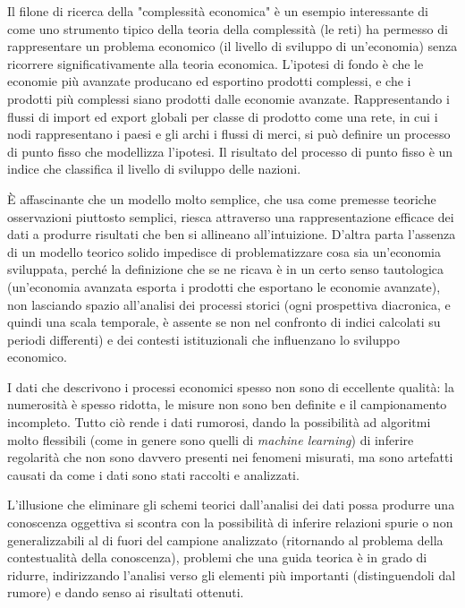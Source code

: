 \documentclass[a4paper, headings=standardclasses]{scrartcl}
\begin{document}
Il filone di ricerca della "complessità economica" \parencite{hidalgo2021} è un esempio interessante di come uno strumento tipico della teoria della complessità (le reti) ha permesso di rappresentare un problema economico (il livello di sviluppo di un'economia) senza ricorrere significativamente alla teoria economica.
L'ipotesi di fondo è che le economie più avanzate producano ed esportino prodotti complessi, e che i prodotti più complessi siano prodotti dalle economie avanzate.
Rappresentando i flussi di import ed export globali per classe di prodotto come una rete, in cui i nodi rappresentano i paesi e gli archi i flussi di merci, si può definire un processo di punto fisso che modellizza l'ipotesi.
Il risultato del processo di punto fisso è un indice che classifica il livello di sviluppo delle nazioni.

È affascinante che un modello molto semplice, che usa come premesse teoriche osservazioni piuttosto semplici, riesca attraverso una rappresentazione efficace dei dati a produrre risultati che ben si allineano all'intuizione.
D'altra parta l'assenza di un modello teorico solido impedisce di problematizzare cosa sia un'economia sviluppata, perché la definizione che se ne ricava è in un certo senso tautologica (un'economia avanzata esporta i prodotti che esportano le economie avanzate), non lasciando spazio all'analisi dei processi storici (ogni prospettiva diacronica, e quindi una scala temporale, è assente se non nel confronto di indici calcolati su periodi differenti) e dei contesti istituzionali che influenzano lo sviluppo economico.

I dati che descrivono i processi economici spesso non sono di eccellente qualità: la numerosità è spesso ridotta, le misure non sono ben definite e il campionamento incompleto.
Tutto ciò rende i dati rumorosi, dando la possibilità ad algoritmi molto flessibili (come in genere sono quelli di \textit{machine learning}) di inferire regolarità che non sono davvero presenti nei fenomeni misurati, ma sono artefatti causati da come i dati sono stati raccolti e analizzati.

L'illusione che eliminare gli schemi teorici dall'analisi dei dati possa produrre una conoscenza oggettiva si scontra con la possibilità di inferire relazioni spurie o non generalizzabili al di fuori del campione analizzato (ritornando al problema della contestualità della conoscenza), problemi che una guida teorica è in grado di ridurre, indirizzando l'analisi verso gli elementi più importanti (distinguendoli dal rumore) e dando senso ai risultati ottenuti.
\end{document}
